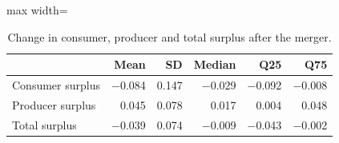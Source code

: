 \begin{table}[H]
\centering\small
\caption{Change in consumer, producer and total surplus after the merger.}\label{tab:q10b_dsurplus}
\begin{adjustbox}{max width=\linewidth}
\begin{tabular}{lrrrrr}
\toprule
 & Mean & SD & Median & Q25 & Q75 \\
\midrule
Consumer surplus & $-$0.084 & 0.147 & $-$0.029 & $-$0.092 & $-$0.008 \\
Producer surplus & 0.045 & 0.078 & 0.017 & 0.004 & 0.048 \\
Total surplus & $-$0.039 & 0.074 & $-$0.009 & $-$0.043 & $-$0.002 \\
\bottomrule
\end{tabular}
\end{adjustbox}
\par\vspace{3pt}{\footnotesize Per market (100 markets, currency units). Producer surplus is the sum of product profits $(p-\hat c)s$; total surplus is the sum of consumer and producer surplus.}
\end{table}
